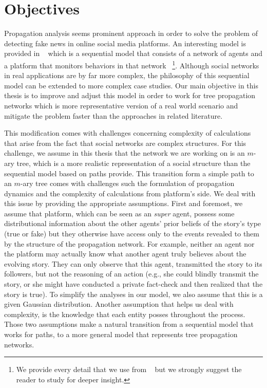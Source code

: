\section{Objectives}
\label{sec:Objectives}
Propagation analysis seems prominent approach in order to solve the problem of detecting fake news in online social media platforms. An interesting model is provided in ~\cite{papanastasiou} which is a sequential model that consists of a network of agents and a platform that monitors behaviors in that network ~\footnote{We provide every detail that we use from ~\cite{papanastasiou} but we strongly suggest the reader to study for deeper insight.}. Although social networks in real applications are by far more complex, the philosophy of this sequential model can be extended to more complex case studies. Our main objective in this thesis is to improve and adjust this model in order to work for tree propagation networks which is more representative version of a real world scenario and mitigate the problem faster than the approaches in related literature.

This modification comes with challenges concerning complexity of calculations that arise from the fact that social networks are complex structures. For this challenge, we assume in this thesis that the network we are working on is an $m$-ary tree, which is a more realistic representation of a social structure than the sequential model based on paths provide. This transition form a simple path to an $m$-ary tree comes with challenges such the formulation of propagation dynamics and the complexity of calculations from platform's side. We deal with this issue by providing the appropriate assumptions. First and foremost, we assume that platform, which can be seen as an \textit{super} agent, possess some distributional information about the other agents' prior beliefs of the story's type (true or fake) but they otherwise have access only to the events revealed to them by the structure of the propagation network. For example, neither an agent nor the platform may actually know what another agent truly believes about the evolving story. They can only observe that this agent, transmitted the story to its followers, but not the reasoning of an action (e.g., she could blindly transmit the story, or she might have conducted a private fact-check and then realized that the story is true). To simplify the analyses in our model, we also assume that this is a given Gaussian distribution. Another assumption that helps us deal with complexity, is the knowledge that each entity posses throughout the process. Those two assumptions make a natural transition from a sequential model that works for paths, to a more general model that represents tree propagation networks.

